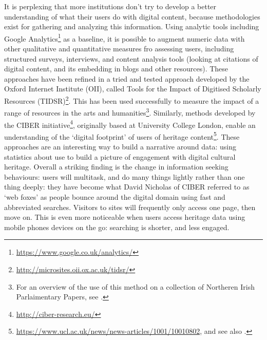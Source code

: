 \documentclass[amsthm,ebook]{saparticle}
\begin{document}
It is perplexing that more institutions don’t try to develop a better understanding of what their users do with digital content, because methodologies exist for gathering and analyzing this information. Using analytic tools including Google Analytics\footnote{\url{https://www.google.co.uk/analytics/}} as a baseline, it is possible to augment numeric data with other qualitative and quantitative measures fro assessing users, including structured surveys, interviews, and content analysis tools (looking at citations of digital content, and its embedding in blogs and other resources). These approaches have been refined in a tried and tested approach developed by the Oxford Internet Institute (OII), called Tools for the Impact of Digitised Scholarly Resources (TIDSR)\footnote{\url{http://microsites.oii.ox.ac.uk/tidsr/}}. This has been used successfully to measure the impact of a range of resources in the arts and humanities\footnote{For an overview of the use of this method on a collection of Northeren Irish Parlaimentary Papers, see \citet{Hughes:2015aa}.}.  Similarly, methods developed by the CIBER initiative\footnote{\url{http://ciber-research.eu/}}, originally based at University College London, enable an understanding of the `digital footprint' of users of heritage content\footnote{\url{https://www.ucl.ac.uk/news/news-articles/1001/10010802}, and see also \citet{Nicholas:2014aa}.}. These approaches are an interesting way to build a narrative around data: using statistics about use to build a picture of engagement with digital cultural heritage. Overall a striking finding is the change in information seeking behaviours: users will multitask, and do many things lightly rather than one thing deeply: they have become what David Nicholas of CIBER referred to as `web foxes' \citep{Nicholas:2015aa} as people bounce around the digital domain using fast and abbreviated searches. Visitors to sites will frequently only access one page, then move on. This is even more noticeable when users access heritage data using mobile phones devices on the go: searching is shorter, and less engaged. 
\end{document}
